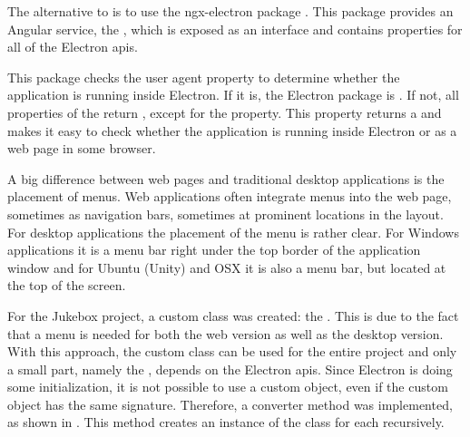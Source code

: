 
The alternative to  is to use the ngx-electron package \cite{ngxElectron}. This package provides an Angular service, the , which is exposed as an interface and contains properties for all of the Electron \gls{api}s.

This package checks the user agent property to determine whether the application is running inside Electron. If it is, the Electron package is . If not, all properties of the  return , except for the  property. This property returns a  and makes it easy to check whether the application is running inside Electron or as a web page in some browser.


A big difference between web pages and traditional desktop applications is the placement of menus. Web applications often integrate menus into the web page, sometimes as navigation bars, sometimes at prominent locations in the layout. For desktop applications the placement of the menu is rather clear. For Windows applications it is a menu bar right under the top border of the application window and for Ubuntu (Unity) and OSX it is also a menu bar, but located at the top of the screen.



For the Jukebox project, a custom  class was created: the . This is due to the fact that a menu is needed for both the web version as well as the desktop version. With this approach, the custom class can be used for the entire project and only a small part, namely the , depends on the Electron \gls{api}s. Since Electron is doing some initialization, it is not possible to use a custom  object, even if the custom object has the same signature. Therefore, a converter method was implemented, as shown in . This method creates an instance of the  class for each  recursively.

\newpage



